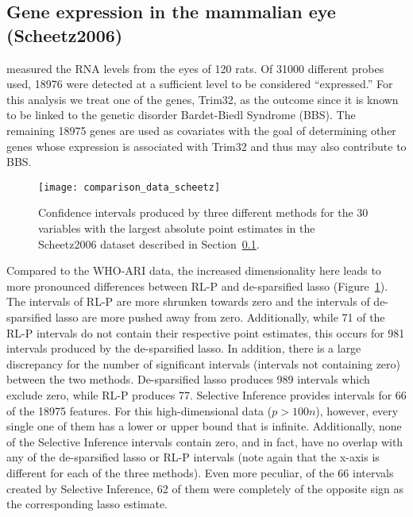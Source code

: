 \subsection{Gene expression in the mammalian eye (Scheetz2006)}\label{Sec:Scheetz2006}

\citet{Scheetz2006} measured the RNA levels from the eyes of 120 rats. Of 31000 different probes used, 18976 were detected at a sufficient level to be considered ``expressed.'' For this analysis we treat one of the genes, Trim32, as the outcome since it is known to be linked to the genetic disorder Bardet-Biedl Syndrome (BBS). The remaining 18975 genes are used as covariates with the goal of determining other genes whose expression is associated with Trim32 and thus may also contribute to BBS.

\begin{figure}[htb!]
  \begin{center}
  \texttt{[image: comparison\_data\_scheetz]}
  \caption{\label{Fig:comparison_data_scheetz} Confidence intervals produced by three different methods for the 30 variables with the largest absolute point estimates in the Scheetz2006 dataset described in Section~\ref{Sec:Scheetz2006}.}
  \end{center}
\end{figure}

Compared to the WHO-ARI data, the increased dimensionality here leads to more pronounced differences between RL-P and de-sparsified lasso (Figure~\ref{Fig:comparison_data_scheetz}). The intervals of RL-P are more shrunken towards zero and the intervals of de-sparsified lasso are more pushed away from zero. Additionally, while 71 of the RL-P intervals do not contain their respective point estimates, this occurs for 981 intervals produced by the de-sparsified lasso. In addition, there is a large discrepancy for the number of significant intervals (intervals not containing zero) between the two methods. De-sparsified lasso produces 989 intervals which exclude zero, while RL-P produces 77. Selective Inference provides intervals for 66 of the 18975 features. For this high-dimensional data ($p > 100n$), however, every single one of them has a lower or upper bound that is infinite. Additionally, none of the Selective Inference intervals contain zero, and in fact, have no overlap with any of the de-sparsified lasso or RL-P intervals (note again that the x-axis is different for each of the three methods). Even more peculiar, of the 66 intervals created by Selective Inference, 62 of them were completely of the opposite sign as the corresponding lasso estimate.

